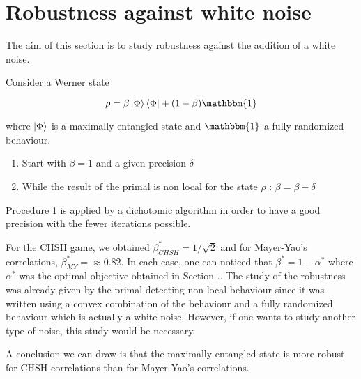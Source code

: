 \section{Robustness against white noise}


The aim of this section is to study robustness against the addition of a white noise. 

Consider a Werner state 

\begin{equation}
    \rho = \beta \ket{\Phi}\bra{\Phi} + (1-\beta) \mathbbm{1}
\end{equation}

where $\ket{\Phi}$ is a maximally entangled state and $\mathbbm{1}$ a fully randomized behaviour. 


\begin{procedure}
\begin{enumerate}
    \item Start with $\beta = 1$ and a given precision $\delta$
    \item While the result of the primal is non local for the state $\rho$ : $\beta = \beta - \delta $
\end{enumerate}
\end{procedure}

Procedure 1 is applied by a dichotomic algorithm in order to have a good precision with the fewer iterations possible. 




\vspace{1cm}

For the CHSH game, we obtained $\beta^*_{CHSH} = 1/\sqrt{2} $ and for Mayer-Yao's correlations, $\beta^*_{MY}= \approx 0.82$. In each case, one can noticed that $\beta^* = 1 - \alpha^*$ where $\alpha^*$ was the optimal objective obtained in Section .. The study of the robustness was already given by the primal detecting non-local behaviour since it was written using a convex combination of the behaviour and a fully randomized behaviour which is actually a white noise. However, if one wants to study another type of noise, this study would be necessary. 

A conclusion we can draw is that the maximally entangled state is more robust for CHSH correlations than for Mayer-Yao's correlations. 


